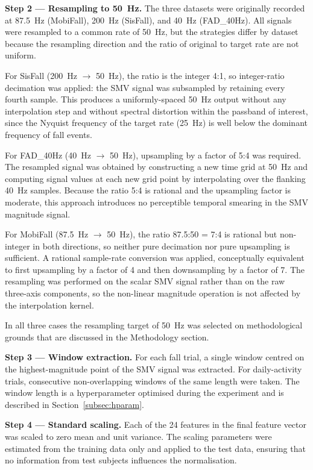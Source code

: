 \textbf{Step 2 --- Resampling to 50~Hz.}
The three datasets were originally recorded at 87.5~Hz (MobiFall), 200~Hz (SisFall), and 40~Hz (FAD\_40Hz). All signals were resampled to a common rate of 50~Hz, but the strategies differ by dataset because the resampling direction and the ratio of original to target rate are not uniform.

For SisFall (200~Hz $\to$ 50~Hz), the ratio is the integer 4:1, so integer-ratio decimation was applied: the SMV signal was subsampled by retaining every fourth sample. This produces a uniformly-spaced 50~Hz output without any interpolation step and without spectral distortion within the passband of interest, since the Nyquist frequency of the target rate (25~Hz) is well below the dominant frequency of fall events.

For FAD\_40Hz (40~Hz $\to$ 50~Hz), upsampling by a factor of 5:4 was required. The resampled signal was obtained by constructing a new time grid at 50~Hz and computing signal values at each new grid point by interpolating over the flanking 40~Hz samples. Because the ratio 5:4 is rational and the upsampling factor is moderate, this approach introduces no perceptible temporal smearing in the SMV magnitude signal.

For MobiFall (87.5~Hz $\to$ 50~Hz), the ratio 87.5:50 = 7:4 is rational but non-integer in both directions, so neither pure decimation nor pure upsampling is sufficient. A rational sample-rate conversion was applied, conceptually equivalent to first upsampling by a factor of 4 and then downsampling by a factor of 7. The resampling was performed on the scalar SMV signal rather than on the raw three-axis components, so the non-linear magnitude operation is not affected by the interpolation kernel.

In all three cases the resampling target of 50~Hz was selected on methodological grounds that are discussed in the Methodology section.

\textbf{Step 3 --- Window extraction.}
For each fall trial, a single window centred on the highest-magnitude point of the SMV signal was extracted. For daily-activity trials, consecutive non-overlapping windows of the same length were taken. The window length is a hyperparameter optimised during the experiment and is described in Section~\ref{subsec:hparam}.

\textbf{Step 4 --- Standard scaling.}
Each of the 24 features in the final feature vector was scaled to zero mean and unit variance. The scaling parameters were estimated from the training data only and applied to the test data, ensuring that no information from test subjects influences the normalisation.

